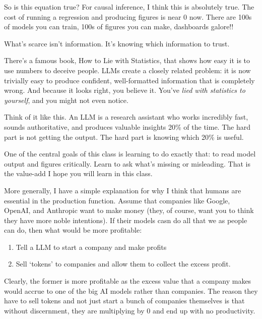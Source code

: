 \documentclass[12pt]{article}
\begin{document}
So is this equation true? 
For causal inference, I think this is absolutely true. 
The cost of running a regression and producing figures is near 0 now. 
There are 100s of models you can train, 100s of figures you can make, dashboards galore!! 

What's scarce isn't information. It's knowing which information to trust.

There's a famous book, How to Lie with Statistics, that shows how easy it is to use numbers to deceive people. 
LLMs create a closely related problem: it is now trivially easy to produce confident, well-formatted information that is completely wrong. 
And because it looks right, you believe it. 
You've \emph{lied with statistics to yourself}, and you might not even notice.

Think of it like this. 
An LLM is a research assistant who works incredibly fast, sounds authoritative, and produces valuable insights 20\% of the time. 
The hard part is not getting the output. 
The hard part is knowing which 20\% is useful.

One of the central goals of this class is learning to do exactly that: to read model output and figures critically. 
Learn to ask what's missing or misleading. 
That is the value-add I hope you will learn in this class.

More generally, I have a simple explanation for why I think that humans are essential in the production function.
Assume that companies like Google, OpenAI, and Anthropic want to make money (they, of course, want you to think they have more noble intentions). 
If their models casn do all that we as people can do, then what would be more profitable:
\begin{enumerate}
  \item Tell a LLM to start a company and make profits
  
  \item Sell `tokens' to companies and allow them to collect the excess profit. 
\end{enumerate}
Clearly, the former is more profitable as the excess value that a company makes would accrue to one of the big AI models rather than companies.
The reason they have to sell tokens and not just start a bunch of companies themselves is that without discernment, they are multiplying by 0 and end up with no productivity. 
\end{document}
